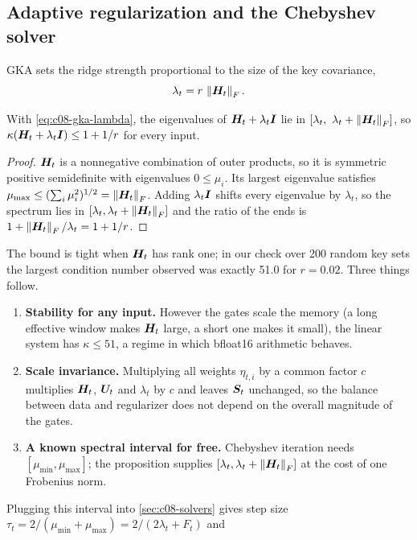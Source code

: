\subsection{Adaptive regularization and the Chebyshev solver}\label{sec:c08-gka-cheb}

GKA sets the ridge strength proportional to the size of the key covariance,
\begin{equation}\label{eq:c08-gka-lambda}
  \lambda_t=r\,\left\lVert \bm{H}_t\right\rVert_F .
\end{equation}
\begin{proposition}\label{prop:c08-kappa}
With \eqref{eq:c08-gka-lambda}, the eigenvalues of $\bm{H}_t+\lambda_t\bm{I}$ lie in
$[\lambda_t,\ \lambda_t+\norm{\mH_t}_F]$, so $\kappa(\bm{H}_t+\lambda_t\bm{I})\le1+1/r$ for every input.
\end{proposition}
\begin{proof}
$\bm{H}_t$ is a nonnegative combination of outer products, so it is symmetric positive semidefinite
with eigenvalues $0\le\mu_i$. Its largest eigenvalue satisfies $\mu_{\max}\le(\sum_i\mu_i^2)^{1/2}
=\left\lVert \bm{H}_t\right\rVert_F$. Adding $\lambda_t\bm{I}$ shifts every eigenvalue by $\lambda_t$, so the spectrum lies
in $[\lambda_t,\lambda_t+\left\lVert \bm{H}_t\right\rVert_F]$ and the ratio of the ends is
$1+\left\lVert \bm{H}_t\right\rVert_F/\lambda_t=1+1/r$.
\end{proof}
The bound is tight when $\bm{H}_t$ has rank one; in our check over 200 random key sets the largest
condition number observed was exactly 51.0 for $r=0.02$. Three things follow.
\begin{enumerate}
  \item \textbf{Stability for any input.} However the gates scale the memory (a long effective
  window makes $\bm{H}_t$ large, a short one makes it small), the linear system has $\kappa\le51$, a
  regime in which bfloat16 arithmetic behaves.
  \item \textbf{Scale invariance.} Multiplying all weights $\eta_{t,i}$ by a common factor $c$
  multiplies $\bm{H}_t$, $\bm{U}_t$ and $\lambda_t$ by $c$ and leaves $\bm{S}_t$ unchanged, so the balance
  between data and regularizer does not depend on the overall magnitude of the gates.
  \item \textbf{A known spectral interval for free.} Chebyshev iteration needs
  $[\mu_{\min},\mu_{\max}]$; the proposition supplies $[\lambda_t,\lambda_t+\left\lVert \bm{H}_t\right\rVert_F]$ at the
  cost of one Frobenius norm.
\end{enumerate}
Plugging this interval into \cref{sec:c08-solvers} gives step size
$\tau_t=2/(\mu_{\min}+\mu_{\max})=2/(2\lambda_t+F_t)$ and
